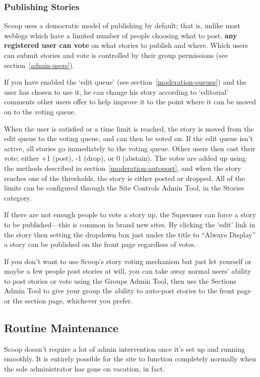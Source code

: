 \subsubsection{Publishing Stories}
\label{how-publishing}

Scoop uses a democratic model of publishing by default; that is, unlike most weblogs which have a limited number of people choosing what to post, {\bf any registered user can vote} on what stories to publish and where.  Which users can submit stories and vote is controlled by their group permissions (see section~\ref{admin-users}).

If you have enabled the `edit queue' (see section~\ref{moderation-queues}) and the user has chosen to use it, he can change his story according to `editorial' comments other users offer to help improve it to the point where it can be moved on to the voting queue.

When the user is satisfied or a time limit is reached, the story is moved from the edit queue to the voting queue, and can then be voted on.  If the edit queue isn't active, all stories go immediately to the voting queue.  Other users then cast their vote; either +1 (post), -1 (drop), or 0 (abstain).  The votes are added up using the methods described in section~\ref{moderation-autopost}, and when the story reaches one of the thresholds, the story is either posted or dropped.  All of the limits can be configured through the Site Controls Admin Tool, in the Stories category.

If there are not enough people to vote a story up, the Superuser can force a story to be published---this is common in brand new sites.  By clicking the `edit' link in the story then setting the dropdown box just under the title to ``Always Display'' a story can be published on the front page regardless of votes.

If you don't want to use Scoop's story voting mechanism but just let yourself or maybe a few people post stories at will, you can take away normal users' ability to post stories or vote using the Groups Admin Tool, then use the Sections Admin Tool to give your group the ability to auto-post stories to the front page or the section page, whichever you prefer.

\subsection{Routine Maintenance}
\label{admin-routine}

Scoop doesn't require a lot of admin intervention once it's set up and running smoothly.  It is entirely possible for the site to function completely normally when the sole administrator has gone on vacation, in fact.

